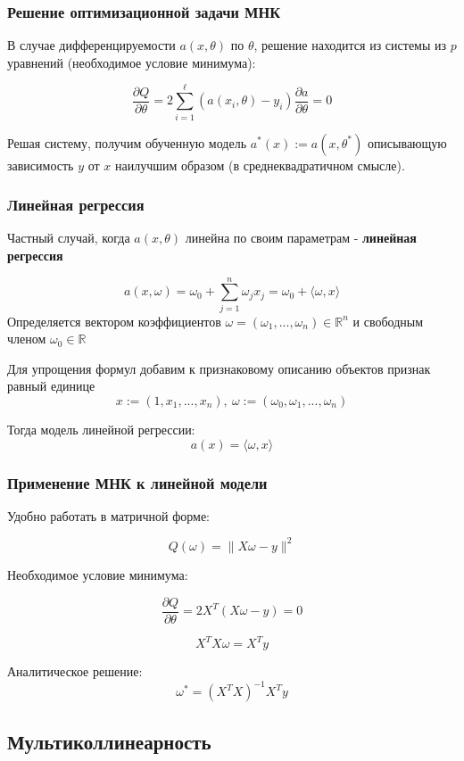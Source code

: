 \documentclass{beamer}
\begin{document}
	\begin{frame}
		\frametitle{Решение оптимизационной задачи МНК}
		В случае дифференцируемости $a(x, \theta)$ по $\theta$, решение находится из системы из $p$ уравнений (необходимое условие минимума):
		
		$$
		\frac{\partial Q}{\partial \theta} = 2 \sum_{i=1}^{\ell} (a(x_i, \theta) - y_i) \frac{\partial a}{\partial \theta} = 0
		$$
		
		\vspace{15pt}
		
		Решая систему, получим обученную модель $a^{*}(x) := a(x, \theta^{*})$ описывающую зависимость $y$ от $x$ наилучшим образом (в среднеквадратичном смысле).		
	\end{frame}
	
	
	\begin{frame}
		\frametitle{Линейная регрессия}
		
		Частный случай, когда $a(x, \theta)$ линейна по своим параметрам - \textbf{линейная регрессия}
		
		$$
		a(x, \omega) = \omega_0 + \sum_{j=1}^{n} \omega_j x_j = 
		\omega_0 + \langle \omega, x\rangle 
		$$
		Определяется вектором коэффициентов $\omega = (\omega_1, ..., \omega_n) \in \mathbb{R}^{n}$ и свободным членом $\omega_0 \in \mathbb{R}$
		
		\vspace{5pt}
		
		Для упрощения формул добавим к признаковому описанию объектов признак равный единице 
		$$x := (1, x_1, ..., x_n), \
		 \omega := (\omega_0, \omega_1, ..., \omega_{n})$$
		 
		Тогда модель линейной регрессии:
		$$
		a(x) = \langle \omega, x \rangle
		$$
	\end{frame}	

	
	\begin{frame}
		\frametitle{Применение МНК к линейной модели}
		Удобно работать в матричной форме:
		
		$$ Q(\omega) = \|X\omega - y\|^{2} $$
		
		Необходимое условие минимума:
		
		$$ \frac{\partial Q}{\partial \theta} = 2X^{T} (X\omega - y) = 0$$
		
		$$ X^{T}X\omega = X^{T}y $$
		
		Аналитическое решение:
		$$ \omega^{*} = (X^{T}X)^{-1} X^{T} y $$
	\end{frame}


	\subsection{Мультиколлинеарность}
	
\end{document}
